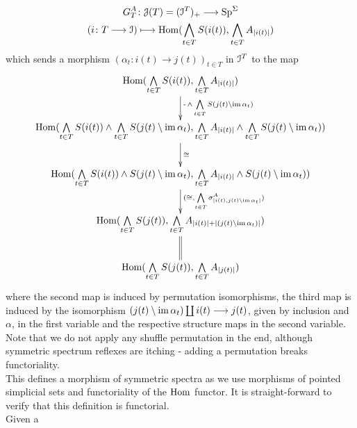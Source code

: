 \begin{defn}
\begin{gather*}
      G^A_T \colon \cJ(T) = (\cI^T)_+ \to \SpS \\
      (i \colon T \to \cI) \mapsto %
        \Hom(\bigwedge_{t \in T} S(i(t)), \bigwedge_{t \in T} A_{\abs{i(t)}} )
    \end{gather*}
    which sends a morphism $(\alpha_t \colon i(t) \to j(t))_{t \in T}$ in $\mathcal{I}^T$ to the map
    \begin{displaymath}
      \xymatrix{
        \Hom(\bigwedge\limits_{t \in T} S(i(t)), \bigwedge\limits_{t \in T} A_{\abs{i(t)}})
          \ar[d]^-{ \operatorname{-} \wedge \bigwedge\limits_{t \in T} S(j(t) \setminus \im \alpha_t) } \\
        \Hom(\bigwedge\limits_{t \in T} S(i(t)) \wedge %
          \bigwedge\limits_{t \in T} S(j(t) \setminus \im \alpha_t), %
          \bigwedge\limits_{t \in T} A_{\abs{i(t)}} \wedge %
          \bigwedge\limits_{t \in T} S(j(t) \setminus \im \alpha_t))
          \ar[d]^-{\cong} \\
        \Hom(\bigwedge\limits_{t \in T} S(i(t)) \wedge S(j(t) \setminus \im \alpha_t), %
          \bigwedge\limits_{t \in T} A_{\abs{i(t)}} \wedge S(j(t) \setminus \im \alpha_t)) 
          \ar[d]^-{(\cong, \bigwedge\limits_{t \in T} \sigma^A_{\abs{i(t),j(t)\setminus\im\alpha_t}})} \\
        \Hom(\bigwedge\limits_{t \in T} S(j(t)), \bigwedge\limits_{t \in T} A_{\abs{i(t)} + \abs{(j(t)\setminus \im \alpha_t)}})
          \ar@{=}[d] \\
        \Hom(\bigwedge\limits_{t \in T} S(j(t)), \bigwedge\limits_{t \in T} A_{\abs{j(t)}})
      }
    \end{displaymath}
    where the second map is induced by permutation isomorphisms, the third map
    is induced by the isomorphism $(j(t) \setminus \operatorname{im} \alpha_t) \coprod i(t)
    \longrightarrow j(t)$, given by inclusion and $\alpha$, in the first variable and the
    respective structure maps in the second variable. Note that we do not
    apply any shuffle permutation in the end, although symmetric spectrum
    reflexes are itching - adding a permutation breaks functoriality.\\ This
    defines a morphism of symmetric spectra as we use morphisms of pointed
    simplicial sets and functoriality of the $\operatorname{Hom}$ functor. It is
    straight-forward to verify that this definition is functorial.\\ Given a

\end{defn}
